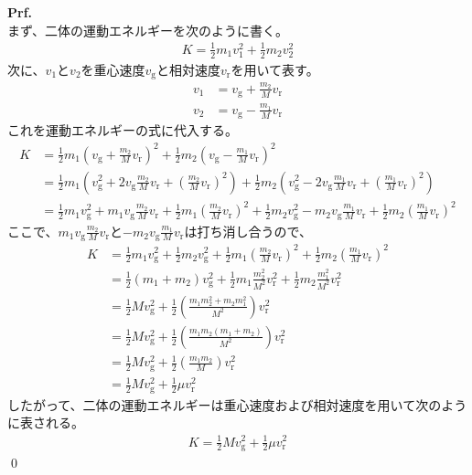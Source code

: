 \documentclass[a4paper,11pt]{jsarticle}
\numberwithin{equation}{section}
\begin{document}
\textbf{Prf.}\\
まず、二体の運動エネルギーを次のように書く。
\begin{align}
    K = \frac{1}{2}m_1v_1^2 + \frac{1}{2}m_2v_2^2
\end{align}
次に、$v_1$と$v_2$を重心速度$v_{\text{g}}$と相対速度$v_{\text{r}}$を用いて表す。
\begin{align}
    v_1 &= v_{\text{g}} + \frac{m_2}{M}v_{\text{r}} \\
    v_2 &= v_{\text{g}} - \frac{m_1}{M}v_{\text{r}}
\end{align}
これを運動エネルギーの式に代入する。
\begin{align}
    K &= \frac{1}{2}m_1\left(v_{\text{g}} + \frac{m_2}{M}v_{\text{r}}\right)^2 + \frac{1}{2}m_2\left(v_{\text{g}} - \frac{m_1}{M}v_{\text{r}}\right)^2 \\
    &= \frac{1}{2}m_1\left(v_{\text{g}}^2 + 2v_{\text{g}}\frac{m_2}{M}v_{\text{r}} + \left(\frac{m_2}{M}v_{\text{r}}\right)^2\right) + \frac{1}{2}m_2\left(v_{\text{g}}^2 - 2v_{\text{g}}\frac{m_1}{M}v_{\text{r}} + \left(\frac{m_1}{M}v_{\text{r}}\right)^2\right) \\
    &= \frac{1}{2}m_1v_{\text{g}}^2 + m_1v_{\text{g}}\frac{m_2}{M}v_{\text{r}} + \frac{1}{2}m_1\left(\frac{m_2}{M}v_{\text{r}}\right)^2 + \frac{1}{2}m_2v_{\text{g}}^2 - m_2v_{\text{g}}\frac{m_1}{M}v_{\text{r}} + \frac{1}{2}m_2\left(\frac{m_1}{M}v_{\text{r}}\right)^2
\end{align}
ここで、$m_1v_{\text{g}}\frac{m_2}{M}v_{\text{r}}$と$-m_2v_{\text{g}}\frac{m_1}{M}v_{\text{r}}$は打ち消し合うので、
\begin{align}
    K &= \frac{1}{2}m_1v_{\text{g}}^2 + \frac{1}{2}m_2v_{\text{g}}^2 + \frac{1}{2}m_1\left(\frac{m_2}{M}v_{\text{r}}\right)^2 + \frac{1}{2}m_2\left(\frac{m_1}{M}v_{\text{r}}\right)^2 \\
    &= \frac{1}{2}(m_1 + m_2)v_{\text{g}}^2 + \frac{1}{2}m_1\frac{m_2^2}{M^2}v_{\text{r}}^2 + \frac{1}{2}m_2\frac{m_1^2}{M^2}v_{\text{r}}^2 \\
    &= \frac{1}{2}Mv_{\text{g}}^2 + \frac{1}{2}\left(\frac{m_1m_2^2 + m_2m_1^2}{M^2}\right)v_{\text{r}}^2 \\
    &= \frac{1}{2}Mv_{\text{g}}^2 + \frac{1}{2}\left(\frac{m_1m_2(m_1 + m_2)}{M^2}\right)v_{\text{r}}^2 \\
    &= \frac{1}{2}Mv_{\text{g}}^2 + \frac{1}{2}\left(\frac{m_1m_2}{M}\right)v_{\text{r}}^2 \\
    &= \frac{1}{2}Mv_{\text{g}}^2 + \frac{1}{2}\mu v_{\text{r}}^2
\end{align}
したがって、二体の運動エネルギーは重心速度および相対速度を用いて次のように表される。
\begin{align}
    K = \frac{1}{2}Mv_{\text{g}}^2 + \frac{1}{2}\mu v_{\text{r}}^2
\end{align}
\qed\\
\end{document}
